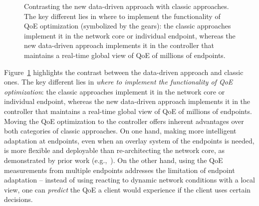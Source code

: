 \begin{figure}[t!]
\captionsetup[subfigure]{justification=centering,farskip=-1pt,captionskip=5pt}
\centering
\hspace{-0.5cm}
\vspace{-0.2cm}
\caption{Contrasting the new data-driven approach with classic approaches. 
The key different lies in where to implement the functionality of QoE optimization (symbolized by the gears): the classic approaches implement 
it in the network core or individual endpoint, whereas the new data-driven approach implements 
it in the controller that maintains a real-time global view of QoE of millions of endpoints.}
\vspace{-0.1cm}
\label{fig:intro:contrast}
\end{figure}

Figure~\ref{fig:intro:contrast} highlights the contrast between
the data-driven approach and classic ones.
The key different lies in {\em where to implement the functionality of QoE 
optimization}: 
the classic approaches implement it in the network core or individual endpoint, 
whereas the new data-driven approach implements it in the controller 
that maintains a real-time global view of QoE of millions of endpoints.
Moving the QoE optimization to the controller offers
inherent advantages over both categories of classic approaches.
On one hand, making more intelligent adaptation at endpoints, 
even when an overlay system of the endpoints is needed, 
is more flexible and deployable than re-architecting the network core, as 
demonstrated by prior work (e.g.,~\cite{chu2002case}).
On the other hand, using the QoE measurements from multiple endpoints 
addresses the limitation of endpoint adaptation -- instead of using
reacting to dynamic network conditions with a local view, one can {\em predict} 
the QoE a client would experience if the client uses certain decisions.

